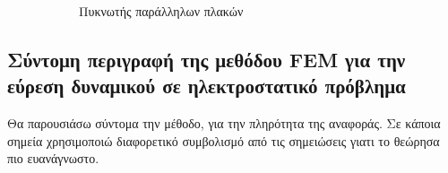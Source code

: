 \documentclass[10pt, letterpaper]{article}
\newcommand{\en}{\selectlanguage{english}}
\newcommand{\gr}{\selectlanguage{greek}}
\begin{document}
\begin{figure}[H]
\begin{subfigure}[b]{0.45\textwidth}
        \caption{Πυκνωτής παράλληλων πλακών}
        \label{fig:capacitor}
    \end{subfigure}
    \caption{}
    \label{fig:definition}
  \end{figure}


\subsection*{Σύντομη περιγραφή της μεθόδου \en FEM \gr για την εύρεση δυναμικού σε ηλεκτροστατικό πρόβλημα}

Θα παρουσιάσω σύντομα την μέθοδο, για την πληρότητα της αναφοράς. Σε κάποια σημεία χρησιμοποιώ διαφορετικό 
συμβολισμό από τις σημειώσεις γιατι το θεώρησα πιο ευανάγνωστο.
\end{document}

